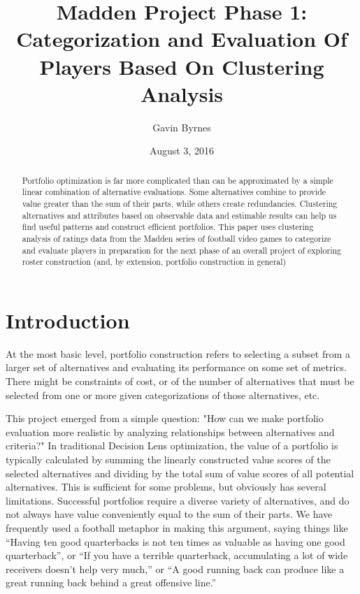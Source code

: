 \documentclass[11pt]{article}
\title{Madden Project Phase 1: Categorization and Evaluation Of Players Based On Clustering Analysis}
\author{Gavin Byrnes}
\date{August 3, 2016}
\begin{document}
\maketitle

\tableofcontents

\begin{abstract}
Portfolio optimization is far more complicated than can be approximated by a simple linear combination of alternative evaluations. Some alternatives combine to provide value greater than the sum of their parts, while others create redundancies. Clustering alternatives and attributes based on observable data and estimable results can help us find useful patterns and construct efficient portfolios. This paper uses clustering analysis of ratings data from the Madden series of football video games to categorize and evaluate players in preparation for the next phase of an overall project of exploring roster construction (and, by extension, portfolio construction in general)
\end{abstract}

\section{Introduction}

At the most basic level, portfolio construction refers to selecting a subset from a larger set of alternatives and evaluating its performance on some set of metrics. There might be constraints of cost, or of the number of alternatives that must be selected from one or more given categorizations of those alternatives, etc.

This project emerged from a simple question: "How can we make portfolio evaluation more realistic by analyzing relationships between alternatives and criteria?" In traditional Decision Lens optimization, the value of a portfolio is typically calculated by summing the linearly constructed value scores of the selected alternatives and dividing by the total sum of value scores of all potential alternatives. This is sufficient for some problems, but obviously has several limitations. Successful portfolios require a diverse variety of alternatives, and do not always have value conveniently equal to the sum of their parts. We have frequently used a football metaphor in making this argument, saying things like ``Having ten good quarterbacks is not ten times as valuable as having one good quarterback'', or ``If you have a terrible quarterback, accumulating a lot of wide receivers doesn't help very much,'' or ``A good running back can produce like a great running back behind a great offensive line.'' 
\end{document}
